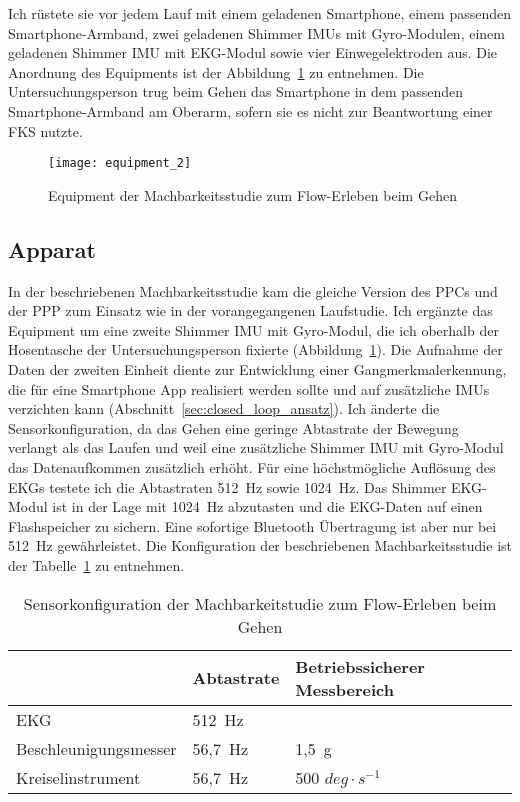 Ich rüstete sie vor jedem Lauf mit einem geladenen Smartphone, einem passenden Smartphone-Armband, zwei geladenen Shimmer \acp{IMU} mit Gyro-Modulen, einem geladenen Shimmer \ac{IMU} mit \ac{EKG}-Modul sowie vier Einwegelektroden aus. Die Anordnung des Equipments ist der Abbildung~\ref{fig:equipment_2} zu entnehmen. Die Untersuchungsperson trug beim Gehen das Smartphone in dem passenden Smartphone-Armband am Oberarm, sofern sie es nicht zur Beantwortung einer \ac{FKS} nutzte. 
\begin{figure}
	[!htb] \centering 
	\texttt{[image: equipment\_2]} \caption[Equipment (Machbarkeitsstudie: Gehen)]{Equipment der Machbarkeitsstudie zum Flow-Erleben beim Gehen} \label{fig:equipment_2} 
\end{figure}

\subsection{Apparat} 

\label{sub:apparat_5_2}

In der beschriebenen Machbarkeitsstudie kam die gleiche Version des \ac{PPC}s und der \ac{PPP} zum Einsatz wie in der vorangegangenen Laufstudie. Ich ergänzte das Equipment um eine zweite Shimmer \ac{IMU} mit Gyro-Modul, die ich oberhalb der Hosentasche der Untersuchungsperson fixierte (Abbildung~\ref{fig:equipment_2}). Die Aufnahme der Daten der zweiten Einheit diente zur Entwicklung einer Gangmerkmalerkennung, die für eine Smartphone App realisiert werden sollte und auf zusätzliche \acp{IMU} verzichten kann (Abschnitt~\ref{sec:closed_loop_ansatz}). Ich änderte die Sensorkonfiguration, da das Gehen eine geringe Abtastrate der Bewegung verlangt als das Laufen und weil eine zusätzliche Shimmer \ac{IMU} mit Gyro-Modul das Datenaufkommen zusätzlich erhöht. Für eine höchstmögliche Auflösung des \ac{EKG}s testete ich die Abtastraten 512~Hz sowie 1024~Hz. Das Shimmer \ac{EKG}-Modul ist in der Lage mit 1024~Hz abzutasten und die \ac{EKG}-Daten auf einen Flashspeicher zu sichern. Eine sofortige Bluetooth Übertragung ist aber nur bei 512~Hz gewährleistet. Die Konfiguration der beschriebenen Machbarkeitsstudie ist der Tabelle~\ref{tab:sensorkonfiguration_2} zu entnehmen. 
\begin{table}
	[!htb] \caption[Sensorkonfiguration (Machbarkeitsstudie: Gehen)]{Sensorkonfiguration der Machbarkeitstudie zum Flow-Erleben beim Gehen} \label{tab:sensorkonfiguration_2} 
	\begin{tabularx}
		{ 
		\textwidth}{p{} p{} p{}} \toprule & Abtastrate & Betriebssicherer Messbereich \\
		\midrule \ac{EKG} & 512~Hz & \\
		Beschleunigungsmesser & 56,7~Hz & 1,5~g \\
		Kreiselinstrument & 56,7~Hz & 500 $deg \cdot s^{-1}$ \\
		\bottomrule 
	\end{tabularx}
\end{table}

